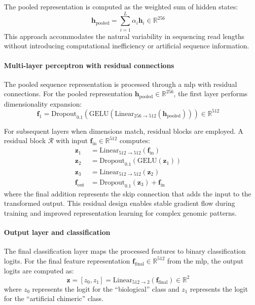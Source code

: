 \documentclass[pdflatex,sn-nature]{sn-jnl}%
\theoremstyle{thmstyleone}%
\theoremstyle{thmstyletwo}%
\theoremstyle{thmstylethree}%
\begin{document}
The pooled representation is computed as the weighted sum of hidden states:
$$
	\mathbf{h}_{\text{pooled}} = \sum_{i=1}^{L} \alpha_i \mathbf{h}_i \in \mathbb{R}^{256}
$$
This approach accommodates the natural variability in sequencing read lengths without introducing computational inefficiency or artificial sequence information.

\paragraph{Multi-layer perceptron with residual connections}
The pooled sequence representation is processed through a \gls{mlp} with residual connections.
For the pooled representation $\mathbf{h}_{\text{pooled}} \in \mathbb{R}^{256}$, the first layer performs dimensionality expansion:
$$
	\mathbf{f}_1 = \text{Dropout}_{0.1}(\text{GELU}(\text{Linear}_{256 \to 512}(\mathbf{h}_{\text{pooled}}))) \in \mathbb{R}^{512}
$$

For subsequent layers when dimensions match, residual blocks are employed.
A residual block $\mathcal{R}$ with input $\mathbf{f}_{\text{in}} \in \mathbb{R}^{512}$ computes:
\begin{align*}
	\mathbf{z}_1            & = \text{Linear}_{512 \to 512}(\mathbf{f}_{\text{in}})         \\
	\mathbf{z}_2            & = \text{Dropout}_{0.1}(\text{GELU}(\mathbf{z}_1))             \\
	\mathbf{z}_3            & = \text{Linear}_{512 \to 512}(\mathbf{z}_2)                   \\
	\mathbf{f}_{\text{out}} & = \text{Dropout}_{0.1}(\mathbf{z}_3) + \mathbf{f}_{\text{in}}
\end{align*}
where the final addition represents the skip connection that adds the input to the transformed output.
This residual design enables stable gradient flow during training and improved representation learning for complex genomic patterns.

\paragraph{Output layer and classification}
The final classification layer maps the processed features to binary classification logits.
For the final feature representation $\mathbf{f}_{\text{final}} \in \mathbb{R}^{512}$ from the \gls{mlp}, the output logits are computed as:
$$
	\mathbf{z} = [z_0, z_1] = \text{Linear}_{512 \to 2}(\mathbf{f}_{\text{final}}) \in \mathbb{R}^{2}
$$
where $z_0$ represents the logit for the ``biological'' class and $z_1$ represents the logit for the ``artificial chimeric'' class.
\end{document}
